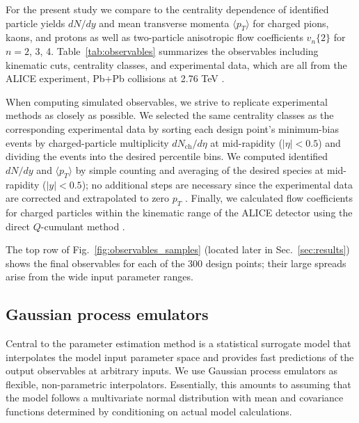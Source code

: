 \documentclass[aps,prc,reprint,amsmath,nofootinbib]{revtex4-1}
\newcommand{\avg}[1]{\langle #1 \rangle}
\newcommand{\nch}{N_\text{ch}}
\newcommand{\vnk}[2]{v_#1\{#2\}}
\begin{document}
For the present study we compare to the centrality dependence of identified particle yields $dN/dy$ and mean transverse momenta $\avg{p_T}$ for charged pions, kaons, and protons as well as two-particle anisotropic flow coefficients $\vnk n 2$ for $n = 2$, 3, 4.
Table~\ref{tab:observables} summarizes the observables including kinematic cuts, centrality classes, and experimental data, which are all from the ALICE experiment, Pb+Pb collisions at 2.76 TeV \cite{Abelev:2013vea,ALICE:2011ab}.

When computing simulated observables, we strive to replicate experimental methods as closely as possible.
We selected the same centrality classes as the corresponding experimental data by sorting each design point's minimum-bias events by charged-particle multiplicity $d\nch/d\eta$ at mid-rapidity ($|\eta| < 0.5$) and dividing the events into the desired percentile bins.
We computed identified $dN/dy$ and $\avg{p_T}$ by simple counting and averaging of the desired species at mid-rapidity ($|y| < 0.5$); no additional steps are necessary since the experimental data are corrected and extrapolated to zero $p_T$ \cite{Abelev:2013vea}.
Finally, we calculated flow coefficients for charged particles within the kinematic range of the ALICE detector using the direct $Q$-cumulant method \cite{Bilandzic:2010jr}.

The top row of Fig.~\ref{fig:observables_samples} (located later in Sec.~\ref{sec:results}) shows the final observables for each of the 300 design points;
their large spreads arise from the wide input parameter ranges.

\subsection{Gaussian process emulators}

\newcommand{\x}{\mathbf x}
\newcommand{\y}{\mathbf y}
\newcommand{\N}{\mathcal N}
\newcommand{\muvec}{\boldsymbol\mu}
\newcommand{\tran}{^\intercal}

Central to the parameter estimation method is a statistical surrogate model that interpolates the model input parameter space and provides fast predictions of the output observables at arbitrary inputs.
We use Gaussian process emulators \cite{Rasmussen:2006gp} as flexible, non-parametric interpolators.
Essentially, this amounts to assuming that the model follows a multivariate normal distribution with mean and covariance functions determined by conditioning on actual model calculations.
\end{document}
